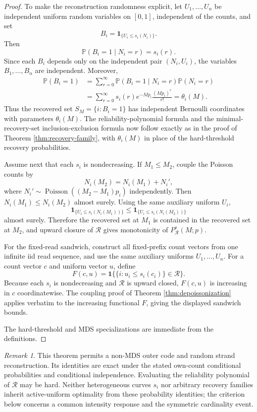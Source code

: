 \documentclass[11pt]{article}
\theoremstyle{definition}
\theoremstyle{remark}
\newtheorem{remark}{Remark}
\DeclareMathOperator{\Poisson}{Poisson}
\newcommand{\Pbb}{\mathbb P}
\newcommand{\1}{\mathbf 1}
\begin{document}
\begin{proof}
To make the reconstruction randomness explicit, let \(U_1,\ldots,U_n\) be independent uniform random variables on \([0,1]\), independent of the counts, and set
\[
  B_i=\1_{\{U_i\le s_i(N_i)\}}.
\]
Then
\[
  \Pbb(B_i=1\mid N_i=r)=s_i(r).
\]
Since each \(B_i\) depends only on the independent pair \((N_i,U_i)\), the variables \(B_1,\ldots,B_n\) are independent.  Moreover,
\[
\begin{aligned}
  \Pbb(B_i=1)
  &=\sum_{r=0}^{\infty}\Pbb(B_i=1\mid N_i=r)\Pbb(N_i=r) \\
  &=\sum_{r=0}^{\infty}s_i(r)e^{-Mp_i}\frac{(Mp_i)^r}{r!}
  =\theta_i(M).
\end{aligned}
\]
Thus the recovered set \(S_M=\{i:B_i=1\}\) has independent Bernoulli coordinates with parameters \(\theta_i(M)\).  The reliability-polynomial formula and the minimal-recovery-set inclusion-exclusion formula now follow exactly as in the proof of Theorem \ref{thm:recovery-family}, with \(\theta_i(M)\) in place of the hard-threshold recovery probabilities.

Assume next that each \(s_i\) is nondecreasing.  If \(M_1\le M_2\), couple the Poisson counts by
\[
  N_i(M_2)=N_i(M_1)+N_i',
\]
where \(N_i'\sim\Poisson((M_2-M_1)p_i)\) independently.  Then \(N_i(M_1)\le N_i(M_2)\) almost surely.  Using the same auxiliary uniform \(U_i\),
\[
  \1_{\{U_i\le s_i(N_i(M_1))\}}
  \le
  \1_{\{U_i\le s_i(N_i(M_2))\}}
\]
almost surely.  Therefore the recovered set at \(M_1\) is contained in the recovered set at \(M_2\), and upward closure of \(\mathcal R\) gives monotonicity of \(P_{\mathcal R}^{s}(M;p)\).

For the fixed-read sandwich, construct all fixed-prefix count vectors from one infinite iid read sequence, and use the same auxiliary uniforms \(U_1,\ldots,U_n\).  For a count vector \(c\) and uniform vector \(u\), define
\[
  F(c,u)=\1\{\{i:u_i\le s_i(c_i)\}\in\mathcal R\}.
\]
Because each \(s_i\) is nondecreasing and \(\mathcal R\) is upward closed, \(F(c,u)\) is increasing in \(c\) coordinatewise.  The coupling proof of Theorem \ref{thm:depoissonization} applies verbatim to the increasing functional \(F\), giving the displayed sandwich bounds.

The hard-threshold and MDS specializations are immediate from the definitions.
\end{proof}

\begin{remark}
This theorem permits a non-MDS outer code and random strand reconstruction. Its identities are exact under the stated own-count conditional probabilities and conditional independence. Evaluating the reliability polynomial of \(\mathcal R\) may be hard. Neither heterogeneous curves \(s_i\) nor arbitrary recovery families inherit active-uniform optimality from these probability identities; the criterion below concerns a common intensity response and the symmetric cardinality event.
\end{remark}
\end{document}
